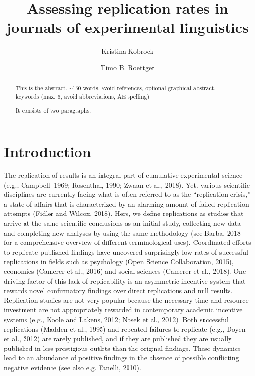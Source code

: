 \documentclass[]{elsarticle} %
\begin{document}
\begin{frontmatter}

  \title{Assessing replication rates in journals of experimental
linguistics}
    \author[University of Osnabrück]{Kristina Kobrock}
    \author[Universitetet i Oslo]{Timo B. Roettger}
  
      \address[University of Osnabrück]{Institute of Cognitive Science,
Wachsbleiche 27, 49090 Osnabrück}
    \address[Universitetet i Oslo]{Department of Linguistics and
Scandinavian Studies}
  
  \begin{abstract}
  This is the abstract. \textasciitilde150 words, avoid references,
  optional graphical abstract, keywords (max. 6, avoid abbreviations, AE
  spelling)

  It consists of two paragraphs.
  \end{abstract}
  
 \end{frontmatter}

\hypertarget{introduction}{%
\section{Introduction}\label{introduction}}

The replication of results is an integral part of cumulative
experimental science (e.g., Campbell, 1969; Rosenthal, 1990; Zwaan et
al., 2018). Yet, various scientific disciplines are currently facing
what is often referred to as the ``replication crisis,'' a state of
affairs that is characterized by an alarming amount of failed
replication attempts (Fidler and Wilcox, 2018). Here, we define
replications as studies that arrive at the same scientific conclusions
as an initial study, collecting new data and completing new analyses by
using the same methodology (see Barba, 2018 for a comprehensive overview
of different terminological uses). Coordinated efforts to replicate
published findings have uncovered surprisingly low rates of successful
replications in fields such as psychology (Open Science Collaboration,
2015), economics (Camerer et al., 2016) and social sciences (Camerer et
al., 2018). One driving factor of this lack of replicability is an
asymmetric incentive system that rewards novel confirmatory findings
over direct replications and null results. Replication studies are not
very popular because the necessary time and resource investment are not
appropriately rewarded in contemporary academic incentive systems (e.g.,
Koole and Lakens, 2012; Nosek et al., 2012). Both successful
replications (Madden et al., 1995) and repeated failures to replicate
(e.g., Doyen et al., 2012) are rarely published, and if they are
published they are usually published in less prestigious outlets than
the original findings. These dynamics lead to an abundance of positive
findings in the absence of possible conflicting negative evidence (see
also e.g. Fanelli, 2010).
\end{document}
